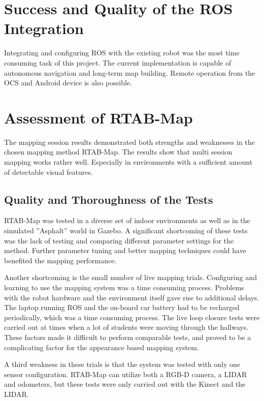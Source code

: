 \section{Success and Quality of the ROS Integration}

Integrating and configuring \ac{ROS} with the existing robot was the most time consuming task of this project. The current implementation is capable of autonomous navigation and long-term map building. Remote operation from the \ac{OCS} and Android device is also possible. 



\section{Assessment of RTAB-Map}

The mapping session results demonstrated both strengths and weaknesses  in the chosen mapping method \ac{RTAB-Map}. The results show that multi session mapping works rather well. Especially in environments with a sufficient amount of detectable visual features. 

\subsection{Quality and Thoroughness of the Tests}

\ac{RTAB-Map} was tested in a diverse set of indoor environments as well as in the simulated ''Asphalt'' world in Gazebo. A significant shortcoming of these tests was the lack of testing and comparing different parameter settings for the method. Further parameter tuning and better mapping techniques could have benefited the mapping performance.

Another shortcoming is the small number of live mapping trials. Configuring and learning to use the mapping system was a time consuming process. Problems with the robot hardware and the environment itself gave rise to additional delays. The laptop running \ac{ROS} and the on-board car battery had to be recharged periodically, which was a time consuming process. The live loop closure tests were carried out at times when a lot of students were moving through the hallways. These factors made it difficult to perform comparable tests, and proved to be a complicating factor for the appearance based mapping system. 

A third weakness in these trials is that the system was tested with only one sensor configuration. \ac{RTAB-Map} can utilize both a RGB-D camera, a LIDAR and odometers, but these tests were only carried out with the Kinect and the LIDAR.

